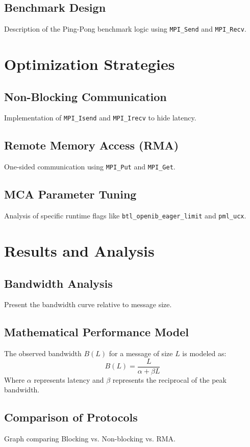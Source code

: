 \documentclass[11pt,a4paper]{article}
\begin{document}
	\subsection{Benchmark Design}
	Description of the Ping-Pong benchmark logic using \texttt{MPI\_Send} and \texttt{MPI\_Recv}.
	
	\section{Optimization Strategies}
	\label{sec:optimization}
	\subsection{Non-Blocking Communication}
	Implementation of \texttt{MPI\_Isend} and \texttt{MPI\_Irecv} to hide latency.
	\subsection{Remote Memory Access (RMA)}
	One-sided communication using \texttt{MPI\_Put} and \texttt{MPI\_Get}.
	\subsection{MCA Parameter Tuning}
	Analysis of specific runtime flags like \texttt{btl\_openib\_eager\_limit} and \texttt{pml\_ucx}.
	
	\section{Results and Analysis}
	\label{sec:results}
	\subsection{Bandwidth Analysis}
	Present the bandwidth curve relative to message size.
	\subsection{Mathematical Performance Model}
	The observed bandwidth $B(L)$ for a message of size $L$ is modeled as:
	$$B(L) = \frac{L}{\alpha + \beta L}$$
	Where $\alpha$ represents latency and $\beta$ represents the reciprocal of the peak bandwidth.
	\subsection{Comparison of Protocols}
	Graph comparing Blocking vs. Non-blocking vs. RMA.
	
\end{document}
